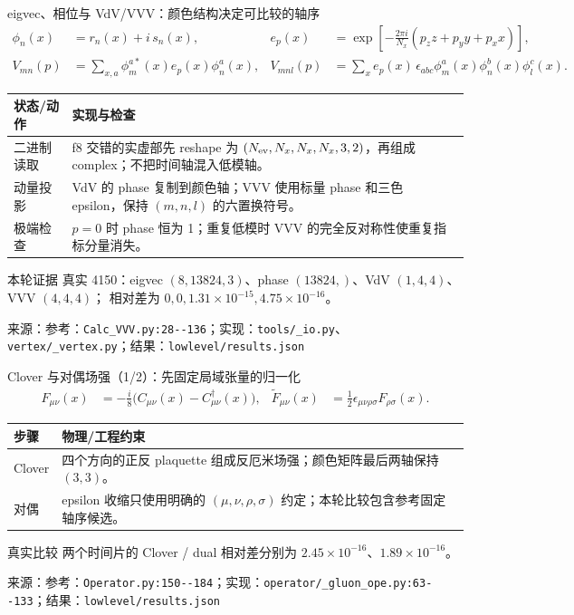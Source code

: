 \documentclass[UTF8,aspectratio=169,11pt]{ctexbeamer}
\newcommand{\source}[1]{\vspace{0.05em}\par{\raggedright\scriptsize\color{muted}来源：#1\par}}
\newcommand{\codepath}[1]{\nolinkurl{#1}}
\begin{document}
\begin{frame}[t]{eigvec、相位与 VdV/VVV：颜色结构决定可比较的轴序}
  \footnotesize
  \begin{align*}
    \phi_n(x)&=r_{n}(x)+i\,s_{n}(x),
    &e_p(x)&=\exp\!\left[-\frac{2\pi i}{N_x}(p_z z+p_y y+p_x x)\right],\\
    V_{mn}(p)&=\sum_{x,a}\phi_m^{a*}(x)e_p(x)\phi_n^a(x),
    &V_{mnl}(p)&=\sum_x e_p(x)\,\epsilon_{abc}\phi_m^a(x)\phi_n^b(x)\phi_l^c(x).
  \end{align*}
  \begin{tabularx}{0.96\textwidth}{@{}L Y@{}}
    \toprule
    状态/动作 & 实现与检查\\
    \midrule
    二进制读取 & f8 交错的实虚部先 reshape 为 $(N_{\rm ev},N_x,N_x,N_x,3,2)$，再组成 complex；不把时间轴混入低模轴。\\
    动量投影 & VdV 的 phase 复制到颜色轴；VVV 使用标量 phase 和三色 epsilon，保持 $(m,n,l)$ 的六置换符号。\\
    极端检查 & $p=0$ 时 phase 恒为 1；重复低模时 VVV 的完全反对称性使重复指标分量消失。\\
    \bottomrule
  \end{tabularx}
  \vfill
  \begin{block}{本轮证据}
    真实 4150：eigvec $(8,13824,3)$、phase $(13824,)$、VdV $(1,4,4)$、VVV $(4,4,4)$；
    相对差为 $0,0,1.31\times10^{-15},4.75\times10^{-16}$。
  \end{block}
  \source{参考：\codepath{Calc_VVV.py:28--136}；实现：\codepath{tools/_io.py}、\codepath{vertex/_vertex.py}；结果：\codepath{lowlevel/results.json}}
\end{frame}

\begin{frame}[t]{Clover 与对偶场强（1/2）：先固定局域张量的归一化}
  \footnotesize
  \begin{align*}
    F_{\mu\nu}(x)&=-\frac{i}{8}\bigl(C_{\mu\nu}(x)-C_{\mu\nu}^{\dagger}(x)\bigr),
    &\widetilde F_{\mu\nu}(x)&=\frac12\epsilon_{\mu\nu\rho\sigma}F_{\rho\sigma}(x).
  \end{align*}
  \begin{tabularx}{0.96\textwidth}{@{}L Y@{}}
    \toprule
    步骤 & 物理/工程约束\\
    \midrule
    Clover & 四个方向的正反 plaquette 组成反厄米场强；颜色矩阵最后两轴保持 $(3,3)$。\\
    对偶 & epsilon 收缩只使用明确的 $(\mu,\nu,\rho,\sigma)$ 约定；本轮比较包含参考固定轴序候选。\\
    \bottomrule
  \end{tabularx}
  \vspace{0.12em}
  \begin{block}{真实比较}
    两个时间片的 Clover / dual 相对差分别为 $2.45\times10^{-16}$、$1.89\times10^{-16}$。
  \end{block}
  \source{参考：\codepath{Operator.py:150--184}；实现：\codepath{operator/_gluon_ope.py:63--133}；结果：\codepath{lowlevel/results.json}}
\end{frame}
\end{document}
